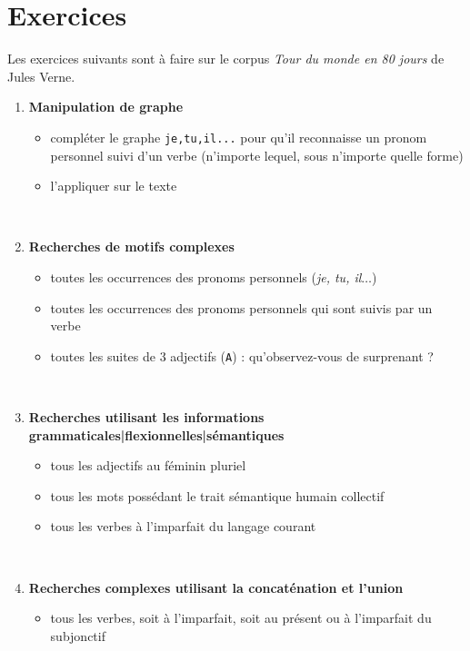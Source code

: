\documentclass[xcolor={table,usenames,dvipsnames}]{article}
\begin{document}
\section{Exercices}
	Les exercices suivants sont à faire sur le corpus \textit{Tour du monde en 80 jours} de Jules Verne.
\begin{enumerate}
	\item \textbf{Manipulation de graphe}
	\begin{itemize}
		\item compléter le graphe \texttt{je,tu,il...} pour qu'il reconnaisse un pronom personnel suivi d'un verbe (n'importe lequel, sous n'importe quelle forme)
		\item l'appliquer sur le texte
	\end{itemize}
	\\
	\bigskip
	
\item \textbf{Recherches de motifs complexes}
	\begin{itemize}
		\item toutes les occurrences des pronoms personnels (\textit{je, tu, il$\dots$})
		\item toutes les occurrences des pronoms personnels qui sont suivis par un verbe
		\item toutes les suites de 3 adjectifs (\texttt{A}) : qu'observez-vous de surprenant ?
	\end{itemize}
	\\
	\bigskip
	
	\item \textbf{Recherches utilisant les informations grammaticales|flexionnelles|sémantiques}
	\begin{itemize}
		\item tous les adjectifs au féminin pluriel
		\item tous les mots possédant le trait sémantique \og{}humain collectif\fg{}
		\item tous les verbes à l'imparfait du langage courant
	\end{itemize}
	
		\\
	\bigskip
	
	\item \textbf{Recherches complexes utilisant la concaténation et l'union}
	\begin{itemize}
		\item tous les verbes, soit à l'imparfait, soit au présent ou à l'imparfait du subjonctif
	\end{itemize}
	\\
	\bigskip


\end{enumerate}
\end{document}
